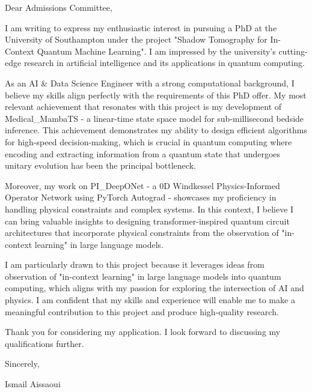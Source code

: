 \documentclass{letter}
\begin{document}
\opening{Dear Admissions Committee,}

I am writing to express my enthusiastic interest in pursuing a PhD at the University of Southampton under the project "Shadow Tomography for In-Context Quantum Machine Learning". I am impressed by the university's cutting-edge research in artificial intelligence and its applications in quantum computing.

As an AI & Data Science Engineer with a strong computational background, I believe my skills align perfectly with the requirements of this PhD offer. My most relevant achievement that resonates with this project is my development of Medical_MambaTS - a linear-time state space model for sub-millisecond bedside inference. This achievement demonstrates my ability to design efficient algorithms for high-speed decision-making, which is crucial in quantum computing where encoding and extracting information from a quantum state that undergoes unitary evolution has been the principal bottleneck.

Moreover, my work on PI_DeepONet - a 0D Windkessel Physics-Informed Operator Network using PyTorch Autograd - showcases my proficiency in handling physical constraints and complex systems. In this context, I believe I can bring valuable insights to designing transformer-inspired quantum circuit architectures that incorporate physical constraints from the observation of "in-context learning" in large language models.

I am particularly drawn to this project because it leverages ideas from observation of "in-context learning" in large language models into quantum computing, which aligns with my passion for exploring the intersection of AI and physics. I am confident that my skills and experience will enable me to make a meaningful contribution to this project and produce high-quality research.

Thank you for considering my application. I look forward to discussing my qualifications further.

Sincerely,

Ismail Aissaoui

\closing{}
\end{document}

